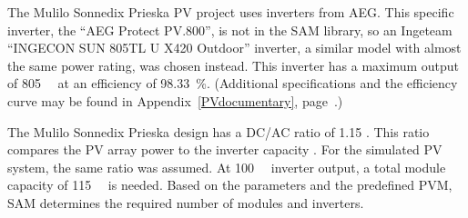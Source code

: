 

The Mulilo Sonnedix Prieska \ac{PV} project uses inverters from AEG. This specific inverter, the \enquote{AEG Protect PV.800}, is not in the \ac{SAM} library, so an Ingeteam \enquote{INGECON SUN 805TL U X420 Outdoor} inverter, a similar model with almost the same power rating, was chosen instead. This inverter has a maximum output of \SI{805}{\kilo\wattsac} at an efficiency of \SI{98.33}{\percent}. (Additional specifications and the efficiency curve may be found in Appendix~\ref{PVdocumentary}, page~\pageref{tbl: PVinverter}.)


The Mulilo Sonnedix Prieska design has a \ac{DC}/\ac{AC} ratio of \num{1.15} \cite{Morse2014}. This ratio compares the \ac{PV} array power to the inverter capacity \cite{Woodcock2013}. For the simulated \ac{PV} system, the same ratio was assumed. At \SI{100}{\mega\wattsac} inverter output, a total module capacity of \SI{115}{\mega\wattsdc} is needed. Based on the parameters and the predefined \ac{PVM}, \ac{SAM} determines the required number of modules and inverters. 

